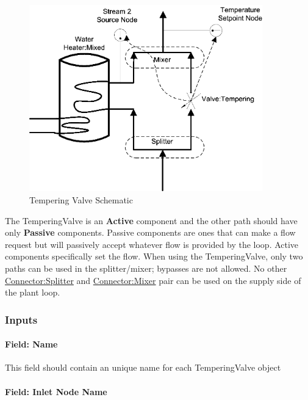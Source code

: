\begin{figure}[hbtp] %
\centering
\includegraphics[width=0.9\textwidth, height=0.9\textheight, keepaspectratio=true]{media/image208.png}
\caption{Tempering Valve Schematic \protect \label{fig:tempering-valve-schematic}}
\end{figure}

The TemperingValve is an \textbf{Active} component and the other path should have only \textbf{Passive} components. Passive components are ones that can make a flow request but will passively accept whatever flow is provided by the loop. Active components specifically set the flow. When using the TemperingValve, only two paths can be used in the splitter/mixer; bypasses are not allowed. No other \hyperref[connectorsplitter]{Connector:Splitter} and \hyperref[connectormixer]{Connector:Mixer} pair can be used on the supply side of the plant loop.

\subsubsection{Inputs}\label{inputs-2-029}

\paragraph{Field: Name}\label{field-name-2-028}

This field should contain an unique name for each TemperingValve object

\paragraph{Field: Inlet Node Name}\label{field-inlet-node-name-003}

